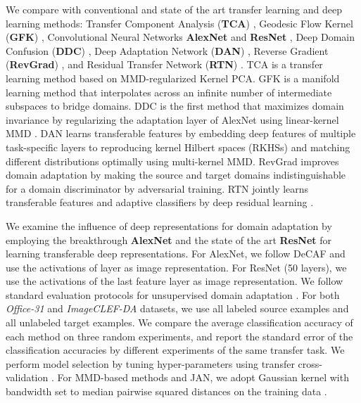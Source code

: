 \documentclass{article}
\begin{document}
We compare with conventional and state of the art transfer learning and deep learning methods: Transfer Component Analysis (\textbf{TCA}) \cite{cite:TNN11TCA}, Geodesic Flow Kernel (\textbf{GFK}) \cite{cite:CVPR12GFK}, Convolutional Neural Networks \textbf{AlexNet} \cite{cite:NIPS12CNN} and \textbf{ResNet} \cite{cite:CVPR16DRL}, Deep Domain Confusion (\textbf{DDC}) \cite{cite:Arxiv14DDC}, Deep Adaptation Network (\textbf{DAN}) \cite{cite:ICML15DAN}, Reverse Gradient (\textbf{RevGrad}) \cite{cite:ICML15RevGrad}, and Residual Transfer Network (\textbf{RTN}) \cite{cite:NIPS16RTN}. TCA is a transfer learning method based on MMD-regularized Kernel PCA. GFK is a manifold learning method that interpolates across an infinite number of intermediate subspaces to bridge domains. DDC is the first method that maximizes domain invariance by regularizing the adaptation layer of AlexNet using linear-kernel MMD \cite{cite:JMLR12MMD}. DAN learns transferable features by embedding deep features of multiple task-specific layers to reproducing kernel Hilbert spaces (RKHSs) and matching different distributions optimally using multi-kernel MMD. RevGrad improves domain adaptation by making the source and target domains indistinguishable for a domain discriminator by adversarial training. RTN jointly learns transferable features and adaptive classifiers by deep residual learning \cite{cite:CVPR16DRL}.

We examine the influence of deep representations for domain adaptation by employing the breakthrough \textbf{AlexNet} \cite{cite:NIPS12CNN} and the state of the art \textbf{ResNet} \cite{cite:CVPR16DRL} for learning transferable deep representations. For AlexNet, we follow DeCAF \cite{cite:ICML14DeCAF} and use the activations of layer   as image representation. For ResNet (50 layers), we use the activations of the last feature layer  as image representation. We follow standard evaluation protocols for unsupervised domain adaptation \cite{cite:ICML15DAN,cite:ICML15RevGrad}. For both \emph{Office-31} and \emph{ImageCLEF-DA} datasets, we use all labeled source examples and all unlabeled target examples. We compare the average classification accuracy of each method on three random experiments, and report the standard error of the classification accuracies by different experiments of the same transfer task. We perform model selection by tuning hyper-parameters using transfer cross-validation \cite{cite:ECML10TCV}. For MMD-based methods and JAN, we adopt Gaussian kernel with bandwidth set to median pairwise squared distances on the training data \cite{cite:JMLR12MMD}.
\end{document}

